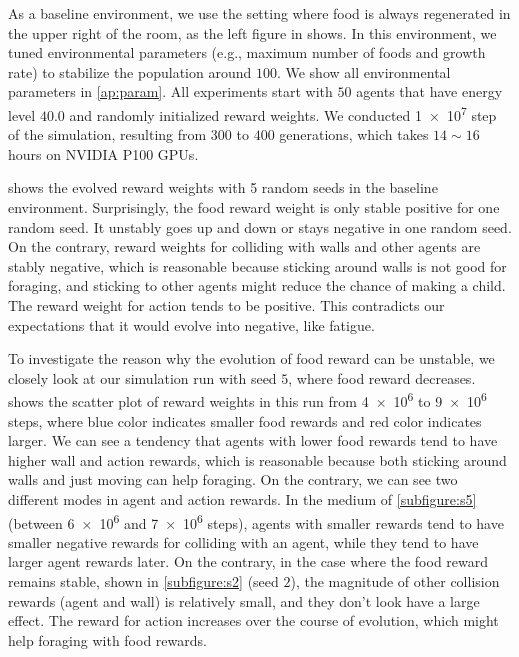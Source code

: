 As a baseline environment, we use the setting where food is always regenerated in the upper right of the room, as the left figure in  shows. In this environment, we tuned environmental parameters (e.g., maximum number of foods and growth rate) to stabilize the population around $100$. We show all environmental parameters in \cref{ap:param}. All experiments start with $50$ agents that have energy level $40.0$ and randomly initialized reward weights. We conducted \num{1e7} step of the simulation, resulting from $300$ to $400$ generations, which takes $14\sim16$ hours on NVIDIA P100 GPUs.

 shows the evolved reward weights with 5 random seeds in the baseline environment. Surprisingly, the food reward weight is only stable positive for one random seed. It unstably goes up and down or stays negative in one random seed. On the contrary, reward weights for colliding with walls and other agents are stably negative, which is reasonable because sticking around walls is not good for foraging, and sticking to other agents might reduce the chance of making a child. The reward weight for action tends to be positive. This contradicts our expectations that it would evolve into negative, like fatigue.

To investigate the reason why the evolution of food reward can be unstable, we closely look at our simulation run with seed $5$, where food reward decreases.  shows the scatter plot of reward weights in this run from \num{4e6} to \num{9e6} steps, where blue color indicates smaller food rewards and red color indicates larger. We can see a tendency that agents with lower food rewards tend to have higher wall and action rewards, which is reasonable because both sticking around walls and just moving can help foraging. On the contrary, we can see two different modes in agent and action rewards. In the medium of \cref{subfigure:s5} (between \num{6e6} and \num{7e6} steps), agents with smaller rewards tend to have smaller negative rewards for colliding with an agent, while they tend to have larger agent rewards later. On the contrary, in the case where the food reward remains stable, shown in \cref{subfigure:s2} (seed $2$), the magnitude of other collision rewards (agent and wall) is relatively small, and they don't look have a large effect. The reward for action increases over the course of evolution, which might help foraging with food rewards.


